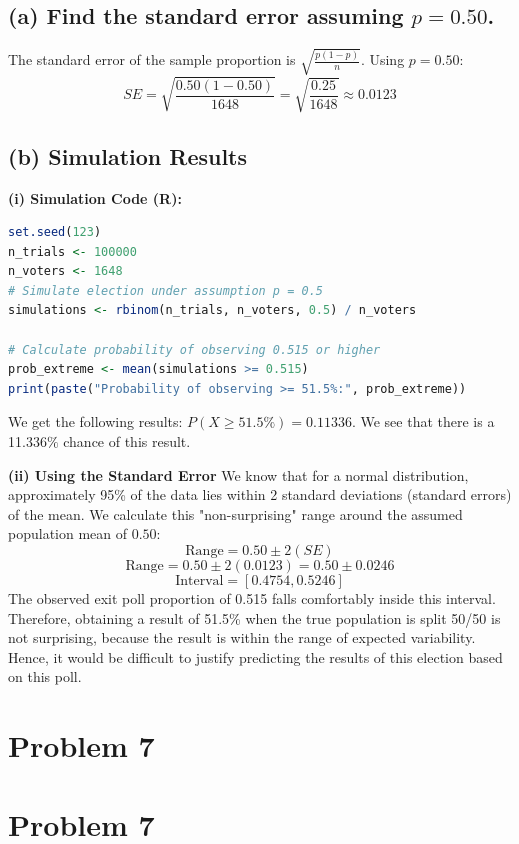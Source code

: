\documentclass[12pt]{article}
\begin{document}
\subsection*{(a) Find the standard error assuming $p=0.50$.}
The standard error of the sample proportion is $\sqrt{\frac{p(1-p)}{n}}$.
Using $p=0.50$:
\[ SE = \sqrt{\frac{0.50(1-0.50)}{1648}} = \sqrt{\frac{0.25}{1648}} \approx 0.0123 \]

\subsection*{(b) Simulation Results}

\textbf{(i) Simulation Code (R):}
\begin{lstlisting}[language=R]
set.seed(123)
n_trials <- 100000
n_voters <- 1648
# Simulate election under assumption p = 0.5
simulations <- rbinom(n_trials, n_voters, 0.5) / n_voters

# Calculate probability of observing 0.515 or higher
prob_extreme <- mean(simulations >= 0.515)
print(paste("Probability of observing >= 51.5%:", prob_extreme))
\end{lstlisting}

\noindent We get the following results: $P(X \geq 51.5\%) = 0.11336$. We see that there is a 11.336$\%$ chance of this result. 

\noindent \textbf{(ii) Using the Standard Error}
We know that for a normal distribution, approximately 95\% of the data lies within 2 standard deviations (standard errors) of the mean.
We calculate this "non-surprising" range around the assumed population mean of $0.50$:
\[ \text{Range} = 0.50 \pm 2(SE) \]
\[ \text{Range} = 0.50 \pm 2(0.0123) = 0.50 \pm 0.0246 \]
\[ \text{Interval} = [0.4754, 0.5246] \]
The observed exit poll proportion of 0.515 falls comfortably inside this interval. Therefore, obtaining a result of 51.5\% when the true population is split 50/50 is not surprising, because the result is within the range of expected variability. Hence, it would be difficult to justify predicting the results of this election based on this poll.

\newpage

\section*{Problem 7}

\section*{Problem 7}
\end{document}
